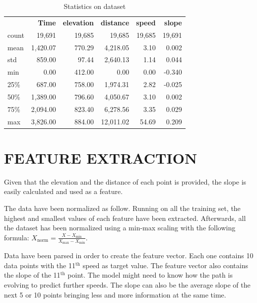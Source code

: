 \documentclass[a4paper, 10pt, conference]{ieeeconf}      %
\begin{document}
\begin{table}[h]
  \caption{Statistics on dataset}
  \begin{center}
    \begin{tabular}{|l||r|r|r|r|r|}
    \hhline{~-----}
    \multicolumn{1}{l|}{} & \textbf{Time} & \textbf{elevation} & \textbf{distance} & \textbf{speed} & \textbf{slope}\\
    \hhline{-=====}
    count & 19,691 & 19,685 & 19,685 & 19,685 & 19,691\\
    mean & 1,420.07 & 770.29 & 4,218.05 & 3.10 & 0.002\\
    std & 859.00 & 97.44 & 2,640.13 & 1.14 & 0.044\\
    min & 0.00 & 412.00 & 0.00 & 0.00 & -0.340\\
    25\% & 687.00 & 758.00 & 1,974.31 & 2.82 & -0.025\\
    50\% & 1,389.00 & 796.60 & 4,050.67 & 3.10 & 0.002\\
    75\% & 2,094.00 & 823.40 & 6,278.56 & 3.35 & 0.029\\
    max & 3,826.00 & 884.00 & 12,011.02 & 54.69 & 0.209\\
    \hline
    \end{tabular}
  \end{center}
  \label{tbl:stats-dataset}
\end{table}

\section{FEATURE EXTRACTION}

Given that the elevation and the distance of each point is provided, the slope is easily calculated and used as a feature.

The data have been normalized as follow. Running on all the training set, the highest and smallest values of each feature have been extracted. Afterwards, all the dataset has been normalized using a min-max scaling with the following formula: $X_{\textrm{norm}} = \frac{X - X_{\textrm{min}}}{X_{\textrm{max}} - X_{\textrm{min}}}$.

Data have been parsed in order to create the feature vector. Each one contains 10 data points with the 11$^{\text{th}}$ speed as target value. The feature vector also contains the slope of the 11$^{\text{th}}$ point. The model might need to know how the path is evolving to predict further speeds. The slope can also be the average slope of the next 5 or 10 points bringing less and more information at the same time.
\end{document}
